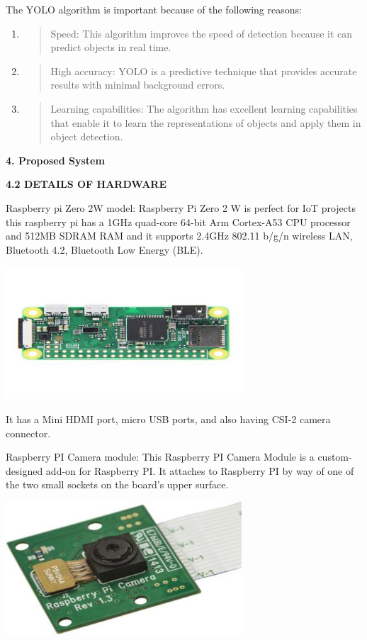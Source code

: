 \documentclass{article}
\begin{document}
The YOLO algorithm is important because of the following reasons:

\begin{enumerate}
\def\labelenumi{\arabic{enumi}.}
\item
  \begin{quote}
  {Speed}: This algorithm improves the speed of detection because it can
  predict objects in real time.
  \end{quote}
\item
  \begin{quote}
  {High accuracy}: YOLO is a predictive technique that provides accurate
  results with minimal background errors.
  \end{quote}
\item
  \begin{quote}
  {Learning capabilities}: The algorithm has excellent learning
  capabilities that enable it to learn the representations of objects
  and apply them in object detection.
  \end{quote}
\end{enumerate}

\textbf{4. Proposed System}

\textbf{4.2 DETAILS OF HARDWARE}

{Raspberry pi Zero 2W model}: Raspberry Pi Zero 2 W is perfect for IoT
projects this raspberry pi has a 1GHz quad-core 64-bit Arm Cortex-A53
CPU processor and 512MB SDRAM RAM and it supports 2.4GHz 802.11 b/g/n
wireless LAN, Bluetooth 4.2, Bluetooth Low Energy (BLE).

\includegraphics[width=3.46667in,height=1.95in]{media/1.jpg}

It has a Mini HDMI port, micro USB ports, and also having CSI-2 camera
connector.

{Raspberry PI Camera module}: This Raspberry PI Camera Module is a
custom-designed add-on for Raspberry PI. It attaches to Raspberry PI by
way of one of the two small sockets on the board's upper surface.

\includegraphics[width=3.46667in,height=1.95in]{media/2.jpg}
\end{document}
